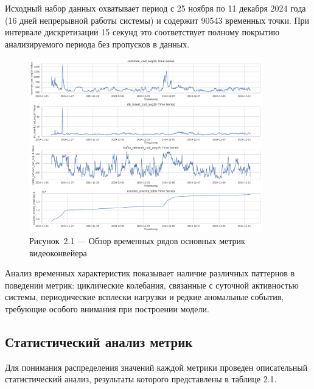 \hspace*{1.25cm}Исходный набор данных охватывает период с 25 ноября по 11 декабря 2024 года (16 дней непрерывной работы системы) и содержит 90543 временных точки. При интервале дискретизации 15 секунд это соответствует полному покрытию анализируемого периода без пропусков в данных.

\begin{figure}[H]
	\centering
	\includegraphics[width=0.9\textwidth]{figures/chapter2/time_series_overview.png}
	\caption*{Рисунок~2.1 --- Обзор временных рядов основных метрик видеоконвейера}
	\label{fig:time_series_overview}
\end{figure}

\hspace*{1.25cm}Анализ временных характеристик показывает наличие различных паттернов в поведении метрик: циклические колебания, связанные с суточной активностью системы, периодические всплески нагрузки и редкие аномальные события, требующие особого внимания при построении модели.

\subsection{Статистический анализ метрик}

\hspace*{1.25cm}Для понимания распределения значений каждой метрики проведен описательный статистический анализ, результаты которого представлены в таблице 2.1.

